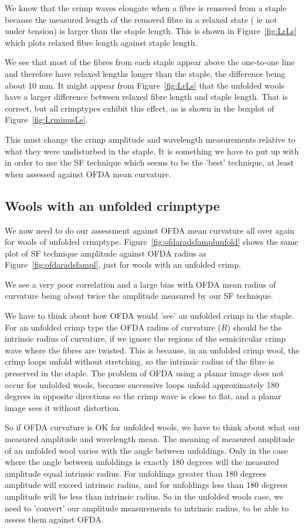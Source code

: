 \documentclass[titlepage,10pt]{article}  %
\begin{document}
We know that the crimp waves elongate when a fibre is removed from a staple because the measured length of the removed fibre in a relaxed state ( ie not under tension) is larger than the staple length. This is shown in Figure~\ref{fig:LrLs} which plots relaxed fibre length against staple length.

We see that most of the fibres from each staple appear above the one-to-one line and therefore have relaxed lengths longer than the staple, the difference being about 10 mm. It might appear from Figure~\ref{fig:LrLs} that the unfolded wools have a larger difference between relaxed fibre length and staple length. That is correct, but all crimptypes exhibit this effect, as is shown in the boxplot of Figure~\ref{fig:LrminusLs}.

 This  must change the crimp amplitude and wavelength measurements relative to what they were undisturbed in the staple. It is something we have to put up with in order to use the SF technique which seems to be the 'best' technique, at least when assessed against OFDA mean curvature.

\clearpage
\subsection{Wools with an unfolded crimptype}
	We now need to do our assessment against OFDA mean curvature all over again for wools of unfolded crimptype. Figure~\ref{fig:ofdaradsfamplunfold}  shows the same plot of SF technique amplitude against OFDA radius as Figure~\ref{fig:ofdaradsfampl}, just for wools with an unfolded crimp.

We see a very poor correlation and a large bias with OFDA mean radius of curvature being about twice the amplitude measured by our SF technique.

We have to think about how OFDA would 'see' an unfolded crimp in the staple.
For an unfolded crimp type the OFDA radius of curvature ($R$) should be the intrinsic radius of curvature, if we ignore the regions of the semicircular crimp wave where the fibres are twisted. This is because, in an unfolded crimp wool, the crimp loops unfold without stretching, so the intrinsic radius of the fibre is preserved in the staple. The problem of OFDA using a planar image does not occur for unfolded wools, because successive loops unfold approximately 180 degrees in opposite directions so the crimp wave is close to flat, and a planar image sees it without distortion. 

So if OFDA curvature is OK for unfolded wools, we have to think about what our measured amplitude and wavelength mean.  The meaning of measured amplitude of an unfolded wool varies with the angle between unfoldings. Only in the case where the angle between unfoldings is exactly 180 degrees will the measured amplitude equal intrinsic radius. For unfoldings greater than 180 degrees amplitude will exceed intrinsic radius, and for unfoldings less than 180 degrees amplitude will be less than intrinsic radius. So in the unfolded wools case, we need to 'convert' our amplitude measurements to intrinsic radius, to be able to assess them against OFDA.
\end{document}
